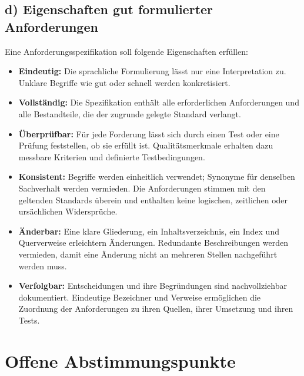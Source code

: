 \documentclass[a4paper,10pt]{article}
\newcommand{\sectionspace}[1]{\par\ifdim
                                      \dimexpr\pagegoal-\pagetotal\relax<#1\relax\newpage
\fi\addvspace{14pt}}
\begin{document}
        \sectionspace{280pt}

        \subsection*{d) Eigenschaften gut formulierter Anforderungen}

        Eine Anforderungsspezifikation soll folgende Eigenschaften erfüllen:

        \begin{itemize}
            \item \textbf{Eindeutig:} Die sprachliche Formulierung lässt nur eine Interpretation zu. Unklare Begriffe wie \glqq{}gut\grqq{} oder \glqq{}schnell\grqq{} werden konkretisiert.
            \item \textbf{Vollständig:} Die Spezifikation enthält alle erforderlichen Anforderungen und alle Bestandteile, die der zugrunde gelegte Standard verlangt.
            \item \textbf{Überprüfbar:} Für jede Forderung lässt sich durch einen Test oder eine Prüfung feststellen, ob sie erfüllt ist. Qualitätsmerkmale erhalten dazu messbare Kriterien und definierte Testbedingungen.
            \item \textbf{Konsistent:} Begriffe werden einheitlich verwendet; Synonyme für denselben Sachverhalt werden vermieden. Die Anforderungen stimmen mit den geltenden Standards überein und enthalten keine logischen, zeitlichen oder ursächlichen Widersprüche.
            \item \textbf{Änderbar:} Eine klare Gliederung, ein Inhaltsverzeichnis, ein Index und Querverweise erleichtern Änderungen. Redundante Beschreibungen werden vermieden, damit eine Änderung nicht an mehreren Stellen nachgeführt werden muss.
            \item \textbf{Verfolgbar:} Entscheidungen und ihre Begründungen sind nachvollziehbar dokumentiert. Eindeutige Bezeichner und Verweise ermöglichen die Zuordnung der Anforderungen zu ihren Quellen, ihrer Umsetzung und ihren Tests.
        \end{itemize}
        \clearpage


        \section*{Offene Abstimmungspunkte}
        \sectionspace{120pt}
\end{document}
